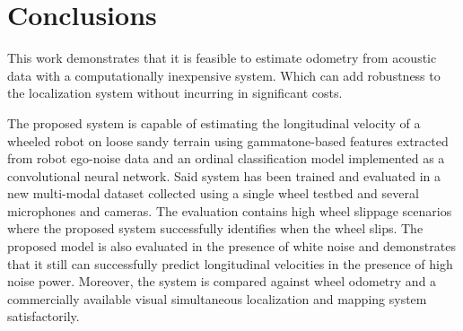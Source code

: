 \section{Conclusions} \label{chap:conclusions}

This work demonstrates that it is feasible to estimate odometry from acoustic
data with a computationally inexpensive system. Which can add robustness to the
localization system without incurring in significant costs.

The proposed system is capable of estimating the longitudinal velocity of a
wheeled robot on loose sandy terrain using gammatone-based features extracted
from robot ego-noise data and an ordinal classification model implemented as a
convolutional neural network. Said system has been trained and evaluated in a
new multi-modal dataset collected using a single wheel testbed and several
microphones and cameras. The evaluation contains high wheel slippage scenarios
where the proposed system successfully identifies when the wheel slips. The
proposed model is also evaluated in the presence of white noise and
demonstrates that it still can successfully predict longitudinal velocities in
the presence of high noise power. Moreover, the system is compared against
wheel odometry and a commercially available visual simultaneous localization
and mapping system satisfactorily.

